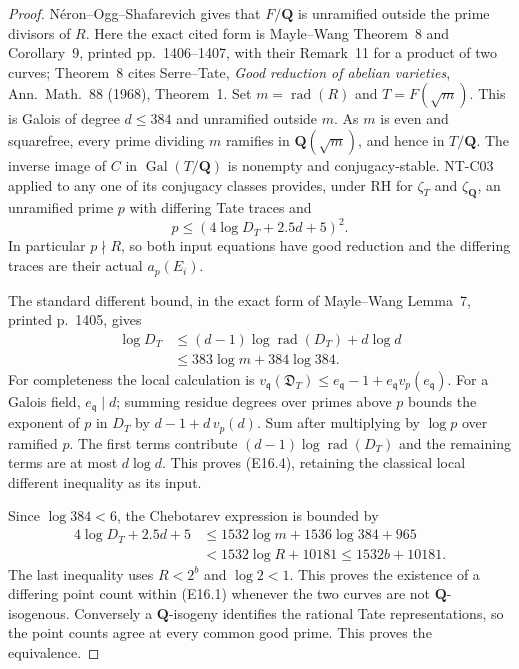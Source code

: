 \begin{proof}
N\'eron--Ogg--Shafarevich gives that $F/\mathbf Q$
is unramified outside the prime divisors of $R$.
Here the exact cited form is Mayle--Wang
Theorem~8 and Corollary~9, printed pp.~1406--1407,
with their Remark~11 for a product of two curves;
Theorem~8 cites Serre--Tate, \emph{Good reduction
of abelian varieties}, Ann.\ Math.~88 (1968),
Theorem~1.
Set $m=\operatorname{rad}(R)$ and
$T=F(\sqrt m)$. This is Galois of degree
$d\le384$ and unramified outside $m$.
As $m$ is even and squarefree, every prime
dividing $m$ ramifies in $\mathbf Q(\sqrt m)$,
and hence in $T/\mathbf Q$.
The inverse image of $C$ in
$\operatorname{Gal}(T/\mathbf Q)$ is nonempty
and conjugacy-stable.
NT-C03 applied to any one of its conjugacy
classes provides, under RH for $\zeta_T$
and $\zeta_{\mathbf Q}$, an unramified prime
$p$ with differing Tate traces and
\[
               p\le(4\log D_T+2.5d+5)^2.
\]
In particular $p\nmid R$, so both input equations
have good reduction and the differing traces
are their actual $a_p(E_i)$.

The standard different bound, in the exact
form of Mayle--Wang Lemma~7, printed p.~1405,
gives
\[
 \begin{split}
 \log D_T
   &\le(d-1)\log\operatorname{rad}(D_T)+d\log d\\
   &\le383\log m+384\log384.
 \end{split}
 \tag{E16.4}
\]
For completeness the local calculation is
$v_{\mathfrak q}(\mathfrak D_T)
 \le e_{\mathfrak q}-1+
             e_{\mathfrak q}v_p(e_{\mathfrak q})$.
For a Galois field, $e_{\mathfrak q}\mid d$;
summing residue degrees over primes above $p$
bounds the exponent of $p$ in $D_T$ by
$d-1+d\,v_p(d)$.
Sum after multiplying by $\log p$ over
ramified $p$. The first terms contribute
$(d-1)\log\operatorname{rad}(D_T)$ and the
remaining terms are at most $d\log d$.
This proves (E16.4), retaining the classical
local different inequality as its input.

Since $\log384<6$, the Chebotarev expression is
bounded by
\[
 \begin{split}
 4\log D_T+2.5d+5
    &\le1532\log m+1536\log384+965\\
    &<1532\log R+10181
     \le1532b+10181.
 \end{split}
 \tag{E16.5}
\]
The last inequality uses $R<2^b$ and $\log2<1$.
This proves the existence of a differing point
count within (E16.1) whenever the two curves
are not $\mathbf Q$-isogenous.
Conversely a $\mathbf Q$-isogeny identifies
the rational Tate representations, so the
point counts agree at every common good
prime. This proves the equivalence.


\end{proof}
